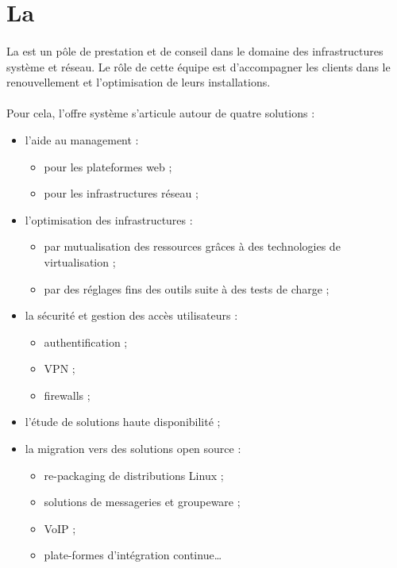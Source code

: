 \section{La \abusys{}}

\paragraph{}
La \abusys{} est un pôle de prestation et de conseil dans le domaine des infrastructures système et réseau.
Le rôle de cette équipe est d'accompagner les clients dans le renouvellement et l'optimisation de leurs installations.

\paragraph{}
Pour cela, l'offre système s'articule autour de quatre solutions :

\begin{itemize}
	\item l'aide au management :
	\begin{itemize}
		\item pour les plateformes web ;
		\item pour les infrastructures réseau ;
	\end{itemize}
	\item l'optimisation des infrastructures :
	\begin{itemize}
		\item par mutualisation des ressources grâces à des technologies de virtualisation ;
		\item par des réglages fins des outils suite à des tests de charge ;
	\end{itemize}
	\item la sécurité et gestion des accès utilisateurs :
	\begin{itemize}
		\item authentification ;
		\item VPN ;
		\item firewalls ;
	\end{itemize}
	\item l'étude de solutions haute disponibilité ;
	\item la migration vers des solutions open source :
	\begin{itemize}
		\item re-packaging de distributions Linux ;
		\item solutions de messageries et groupeware ;
		\item VoIP ;
		\item plate-formes d'intégration continue\ldots
	\end{itemize}
\end{itemize}


